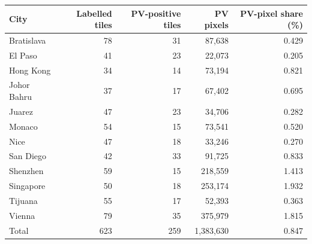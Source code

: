 {\small
\begin{tabular}{lrrrr}
\toprule
City & Labelled tiles & PV-positive tiles & PV pixels & PV-pixel share (\%) \\
\midrule
Bratislava & 78 & 31 & 87,638 & 0.429 \\
El Paso & 41 & 23 & 22,073 & 0.205 \\
Hong Kong & 34 & 14 & 73,194 & 0.821 \\
Johor Bahru & 37 & 17 & 67,402 & 0.695 \\
Juarez & 47 & 23 & 34,706 & 0.282 \\
Monaco & 54 & 15 & 73,541 & 0.520 \\
Nice & 47 & 18 & 33,246 & 0.270 \\
San Diego & 42 & 33 & 91,725 & 0.833 \\
Shenzhen & 59 & 15 & 218,559 & 1.413 \\
Singapore & 50 & 18 & 253,174 & 1.932 \\
Tijuana & 55 & 17 & 52,393 & 0.363 \\
Vienna & 79 & 35 & 375,979 & 1.815 \\
\midrule
Total & 623 & 259 & 1,383,630 & 0.847 \\
\bottomrule
\end{tabular}
}
